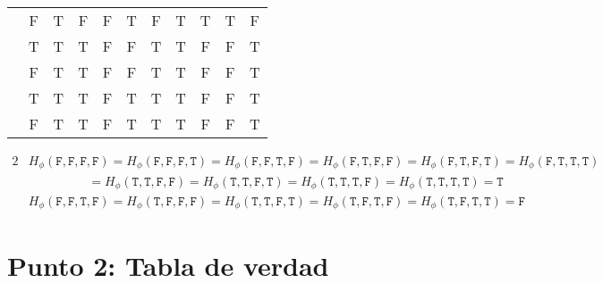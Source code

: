 \documentclass{article}
\begin{document}
\begin{center}
\begin{NiceTabular}{|c|c|c|c|c|c|c|c|c|c|c|}
         &  \ttfamily F & \ttfamily T & \ttfamily F & \ttfamily F & \ttfamily T & \ttfamily F & \ttfamily T & \ttfamily T & \ttfamily T & \ttfamily F\\
         &  \ttfamily T & \ttfamily T & \ttfamily T & \ttfamily F & \ttfamily F & \ttfamily T & \ttfamily T & \ttfamily F & \ttfamily F & \ttfamily T\\
         &  \ttfamily F & \ttfamily T & \ttfamily T & \ttfamily F & \ttfamily F & \ttfamily T & \ttfamily T & \ttfamily F & \ttfamily F & \ttfamily T\\
         &  \ttfamily T & \ttfamily T & \ttfamily T & \ttfamily F & \ttfamily T & \ttfamily T & \ttfamily T & \ttfamily F & \ttfamily F & \ttfamily T\\
         &  \ttfamily F & \ttfamily T & \ttfamily T & \ttfamily F & \ttfamily T & \ttfamily T & \ttfamily T & \ttfamily F & \ttfamily F & \ttfamily T\\
        \hline
    \end{NiceTabular}
\end{center}
\begin{alignat*}{2}
    &H_{\phi}(\mathtt{F}, \mathtt{F}, \mathtt{F}, \mathtt{F}) = 
    H_{\phi}(\mathtt{F}, \mathtt{F}, \mathtt{F}, \mathtt{T}) = 
    H_{\phi}(\mathtt{F}, \mathtt{F}, \mathtt{T}, \mathtt{F}) = 
    H_{\phi}(\mathtt{F}, \mathtt{T}, \mathtt{F}, \mathtt{F}) = 
    H_{\phi}(\mathtt{F}, \mathtt{T}, \mathtt{F}, \mathtt{T}) =
    H_{\phi}(\mathtt{F}, \mathtt{T}, \mathtt{T}, \mathtt{T})\\ 
    &\hspace{2cm} = H_{\phi}(\mathtt{T}, \mathtt{T}, \mathtt{F}, \mathtt{F}) = 
    H_{\phi}(\mathtt{T}, \mathtt{T}, \mathtt{F}, \mathtt{T}) = 
    H_{\phi}(\mathtt{T}, \mathtt{T}, \mathtt{T}, \mathtt{F}) = 
    H_{\phi}(\mathtt{T}, \mathtt{T}, \mathtt{T}, \mathtt{T}) = \mathtt{T}\\[1cm]
    &H_{\phi}(\mathtt{F}, \mathtt{F}, \mathtt{T}, \mathtt{F}) =
    H_{\phi}(\mathtt{T}, \mathtt{F}, \mathtt{F}, \mathtt{F}) =
    H_{\phi}(\mathtt{T}, \mathtt{T}, \mathtt{F}, \mathtt{T}) =
    H_{\phi}(\mathtt{T}, \mathtt{F}, \mathtt{T}, \mathtt{F}) =
    H_{\phi}(\mathtt{T}, \mathtt{F}, \mathtt{T}, \mathtt{T}) = \mathtt{F}
\end{alignat*}
\section{Punto 2: Tabla de verdad}
\end{document}
